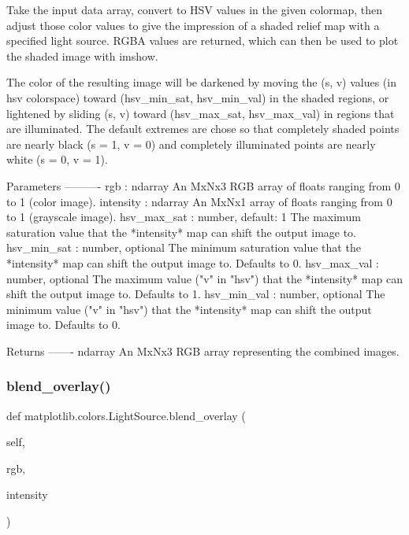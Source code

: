 \begin{DoxyVerb}Take the input data array, convert to HSV values in the given colormap,
then adjust those color values to give the impression of a shaded
relief map with a specified light source.  RGBA values are returned,
which can then be used to plot the shaded image with imshow.

The color of the resulting image will be darkened by moving the (s, v)
values (in hsv colorspace) toward (hsv_min_sat, hsv_min_val) in the
shaded regions, or lightened by sliding (s, v) toward (hsv_max_sat,
hsv_max_val) in regions that are illuminated.  The default extremes are
chose so that completely shaded points are nearly black (s = 1, v = 0)
and completely illuminated points are nearly white (s = 0, v = 1).

Parameters
----------
rgb : ndarray
    An MxNx3 RGB array of floats ranging from 0 to 1 (color image).
intensity : ndarray
    An MxNx1 array of floats ranging from 0 to 1 (grayscale image).
hsv_max_sat : number, default: 1
    The maximum saturation value that the *intensity* map can shift the
    output image to.
hsv_min_sat : number, optional
    The minimum saturation value that the *intensity* map can shift the
    output image to. Defaults to 0.
hsv_max_val : number, optional
    The maximum value ("v" in "hsv") that the *intensity* map can shift
    the output image to. Defaults to 1.
hsv_min_val : number, optional
    The minimum value ("v" in "hsv") that the *intensity* map can shift
    the output image to. Defaults to 0.

Returns
-------
ndarray
    An MxNx3 RGB array representing the combined images.
\end{DoxyVerb}
 \mbox{\label{classmatplotlib_1_1colors_1_1LightSource_a0c50b1c06aeafa8731c651e4281d2e0b}} 
\subsubsection{\texorpdfstring{blend\+\_\+overlay()}{blend\_overlay()}}
{\footnotesize\ttfamily def matplotlib.\+colors.\+Light\+Source.\+blend\+\_\+overlay (\begin{DoxyParamCaption}\item[{}]{self,  }\item[{}]{rgb,  }\item[{}]{intensity }\end{DoxyParamCaption})}

